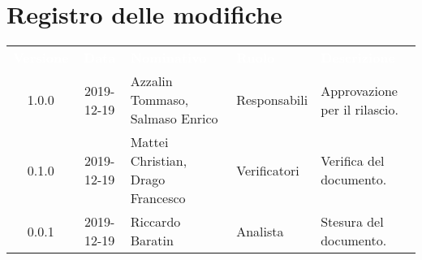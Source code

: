 \section*{Registro delle modifiche}
{
\renewcommand{\arraystretch}{1.5}
\centering
\begin{longtable}{ c c  C{4cm}  C{3cm} C{4cm}}
\textcolor{white}{\textbf{Versione}} & \textcolor{white}{\textbf{Data}} & \textcolor{white}{\textbf{Nominativo}} & \textcolor{white}{\textbf{Ruolo}} & \textcolor{white}{\textbf{Descrizione}}\\	


1.0.0 & 2019-12-19 & Azzalin Tommaso, Salmaso Enrico & Responsabili & Approvazione per il rilascio.  \\
        
0.1.0 & 2019-12-19 & Mattei Christian, Drago Francesco & Verificatori & Verifica del documento.  \\
		
0.0.1 & 2019-12-19 & Riccardo Baratin & Analista & Stesura del documento.  \\
		
		
\end{longtable}
}